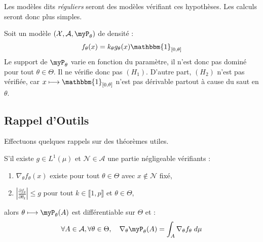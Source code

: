 Les modèles dits \emph{réguliers} seront des modèles vérifiant ces hypothèses. Les calculs seront donc plus 
simples.



\begin{example}
    Soit un modèle $( \mathcal{X}, \mathcal{A}, \myP_\theta)$ de densité : 
        $$ f_\theta(x) = k_\theta g_\theta(x) \mathbbm{1}_{[0, \theta]} $$
    Le support de $ \myP_\theta$ varie en fonction du paramètre, il n'est donc pas dominé 
    pour tout $ \theta \in \Theta$. Il ne vérifie donc pas $(H_1)$. 
    D'autre part, $(H_2)$ n'est pas vérifiée, car $ x \longmapsto \mathbbm{1}_{[0, \theta]}$ n'est pas dérivable 
    partout à cause du saut en $ \theta$. 
\end{example}

\subsection{Rappel d'Outils}

Effectuons quelques rappels sur des théorèmes utiles. 

\begin{rappel}
    S'il existe $ g \in L^1( \mu)$ et $ \mathcal{N} \in \mathcal{A}$ une partie négligeable vérifiants : 
    \begin{enumerate}[label=\roman*)]
        \item $ \nabla_\theta f_\theta(x) $ existe pour tout $ \theta \in \Theta$ avec $x \not \in \mathcal{N}$ fixé, 
        \item $ \displaystyle \left| \frac{ \partial f_\theta}{ \partial \theta_k}\right| \leqslant g $
            pour tout $ k \in \llbracket 1, p \rrbracket$ et $ \theta \in \Theta$, 
    \end{enumerate}
    alors $ \theta \longmapsto \myP_\theta(A)$ est différentiable sur $ \Theta$ et : 
        $$ 
            \forall A \in \mathcal{A}, \forall \theta \in \Theta, \quad 
            \nabla_\theta \myP_\theta(A) = \int_A \nabla_\theta f_\theta \; d \mu 
        $$
\end{rappel}

